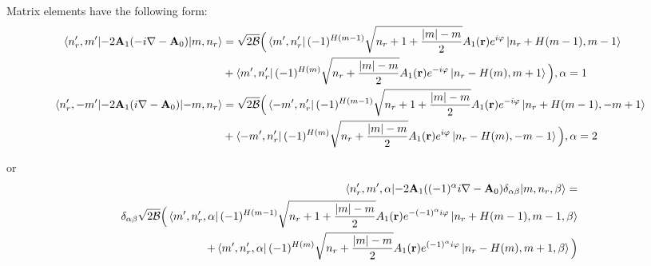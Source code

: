 \documentclass[a4paper,article,14pt]{extarticle}
\begin{document}
Matrix elements have the following form:
\begin{equation}
\begin{aligned}
\mel{n_r',m'} {-2 \mathbf{A}_1  (-i \nabla - \mathbf{A}_0 ) }{m, n_r} &= \sqrt{ {2\cal{B}} } \Big( \bra{m', n_r'} (-1)^{H(m-1)}  \sqrt{n_r + 1 + \frac{|m| - m}{2}  }  A_{1} (\mathbf{r}) e^{i \varphi}   \ket{n_r+H(m-1), m-1} \\
&+ \bra{m', n_r'} (-1)^{H(m)} \sqrt{  n_r + \frac{|m| - m}{2}  }  A_{1} (\mathbf{r}) e^{-i \varphi} \ket{n_r-H(m), m+1} \Big),  \alpha = 1 \\
\mel{n_r',-m'} {-2 \mathbf{A}_1  (i \nabla - \mathbf{A}_0 ) }{-m, n_r} &= \sqrt{ {2\cal{B}} } \Big(  \bra{-m', n_r'} (-1)^{H(m-1)} \sqrt{  n_r + 1 + \frac{|m| - m}{2}  }  A_{1} (\mathbf{r}) e^{-i \varphi} \ket{n_r+H(m-1), -m+1} \\
&+ \bra{-m', n_r'} (-1)^{H(m)}  \sqrt{ n_r + \frac{|m| - m}{2}   }  A_{1} (\mathbf{r}) e^{i \varphi }   \ket{n_r-H(m), -m-1}  \Big), \alpha = 2
\end{aligned}
\end{equation}

\noindent or 
\begin{equation}
\begin{aligned}
\mel{n_r',m',\alpha} {-2 \mathbf{A}_1  ((-1)^\alpha i \nabla - \mathbf{A}_0 ) \delta_{\alpha \beta} }{m, n_r,\beta} =\\
 \delta_{\alpha \beta} \sqrt{ {2\cal{B}} } \Big( 
\bra{m', n_r',\alpha} (-1)^{H(m-1)}  \sqrt{n_r + 1 + \frac{|m| - m}{2}  }  A_{1} (\mathbf{r}) e^{ -(-1)^{\alpha} i \varphi}   \ket{n_r+H(m-1), m-1,\beta}  \\
+ \bra{m', n_r',\alpha} (-1)^{H(m)} \sqrt{  n_r + \frac{|m| - m}{2}  }  A_{1} (\mathbf{r}) e^{(-1)^\alpha i \varphi} \ket{n_r-H(m), m +1 ,\beta}   \Big) \\
\end{aligned}
\end{equation}
\end{document}
